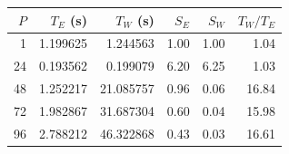 \begin{center}
\small
\begin{tabular}{rrrrrr}
\toprule
$P$ & $T_E$ (s) & $T_W$ (s) & $S_E$ & $S_W$ & $T_W/T_E$ \\
\midrule
1 & 1.199625 & 1.244563 & 1.00 & 1.00 & 1.04 \\
24 & 0.193562 & 0.199079 & 6.20 & 6.25 & 1.03 \\
48 & 1.252217 & 21.085757 & 0.96 & 0.06 & 16.84 \\
72 & 1.982867 & 31.687304 & 0.60 & 0.04 & 15.98 \\
96 & 2.788212 & 46.322868 & 0.43 & 0.03 & 16.61 \\
\bottomrule
\end{tabular}
\end{center}
